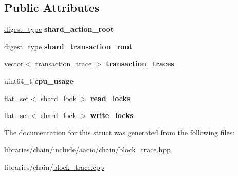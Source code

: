 \subsection*{Public Attributes}
\begin{DoxyCompactItemize}
\item 
\mbox{\label{structaacio_1_1chain_1_1shard__trace_ac7a329827a7b7f824bfa836977c1d8bf}} 
\mbox{\hyperlink{classfc_1_1sha256}{digest\+\_\+type}} {\bfseries shard\+\_\+action\+\_\+root}
\item 
\mbox{\label{structaacio_1_1chain_1_1shard__trace_a5bbc6a6fc2e8df3dee0e8323f6bcbd04}} 
\mbox{\hyperlink{classfc_1_1sha256}{digest\+\_\+type}} {\bfseries shard\+\_\+transaction\+\_\+root}
\item 
\mbox{\label{structaacio_1_1chain_1_1shard__trace_ad5bc5529258cceec90fdea8ce558dab7}} 
\mbox{\hyperlink{classstd_1_1vector}{vector}}$<$ \mbox{\hyperlink{structaacio_1_1chain_1_1transaction__trace}{transaction\+\_\+trace}} $>$ {\bfseries transaction\+\_\+traces}
\item 
\mbox{\label{structaacio_1_1chain_1_1shard__trace_ac00aa54942a0db818ef9c0743d4c2b00}} 
uint64\+\_\+t {\bfseries cpu\+\_\+usage}
\item 
\mbox{\label{structaacio_1_1chain_1_1shard__trace_acd2078e637e6261e919b4cc8a2c0cfc9}} 
flat\+\_\+set$<$ \mbox{\hyperlink{structaacio_1_1chain_1_1shard__lock}{shard\+\_\+lock}} $>$ {\bfseries read\+\_\+locks}
\item 
\mbox{\label{structaacio_1_1chain_1_1shard__trace_afaa9a9c61290fba84f74f10aa024b17e}} 
flat\+\_\+set$<$ \mbox{\hyperlink{structaacio_1_1chain_1_1shard__lock}{shard\+\_\+lock}} $>$ {\bfseries write\+\_\+locks}
\end{DoxyCompactItemize}


The documentation for this struct was generated from the following files\+:\begin{DoxyCompactItemize}
\item 
libraries/chain/include/aacio/chain/\mbox{\hyperlink{block__trace_8hpp}{block\+\_\+trace.\+hpp}}\item 
libraries/chain/\mbox{\hyperlink{block__trace_8cpp}{block\+\_\+trace.\+cpp}}\end{DoxyCompactItemize}
